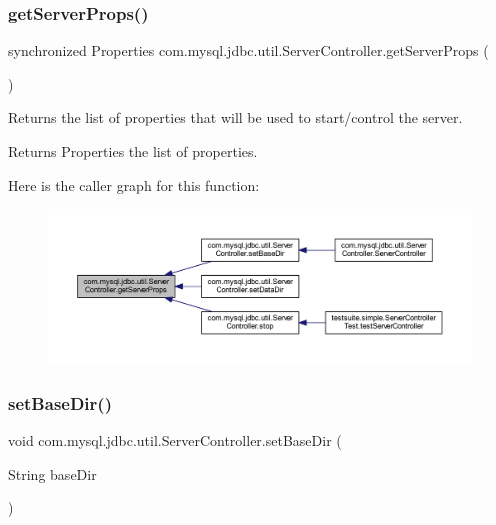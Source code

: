 \subsubsection{\texorpdfstring{get\+Server\+Props()}{getServerProps()}}
{\footnotesize\ttfamily synchronized Properties com.\+mysql.\+jdbc.\+util.\+Server\+Controller.\+get\+Server\+Props (\begin{DoxyParamCaption}{ }\end{DoxyParamCaption})}

Returns the list of properties that will be used to start/control the server.

\begin{DoxyReturn}{Returns}
Properties the list of properties. 
\end{DoxyReturn}
Here is the caller graph for this function\+:
\nopagebreak
\begin{figure}[H]
\begin{center}
\leavevmode
\includegraphics[width=350pt]{classcom_1_1mysql_1_1jdbc_1_1util_1_1_server_controller_a2e172aa91ee196f2e0eacd651f2ae616_icgraph}
\end{center}
\end{figure}
\mbox{\label{classcom_1_1mysql_1_1jdbc_1_1util_1_1_server_controller_a231fbe6ed87c19ede2f71fa92e79cf78}} 
\subsubsection{\texorpdfstring{set\+Base\+Dir()}{setBaseDir()}}
{\footnotesize\ttfamily void com.\+mysql.\+jdbc.\+util.\+Server\+Controller.\+set\+Base\+Dir (\begin{DoxyParamCaption}\item[{String}]{base\+Dir }\end{DoxyParamCaption})}


